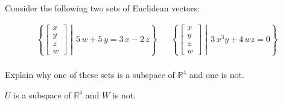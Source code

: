 
\begin{exerciseStatement}


Consider the following two sets of Euclidean vectors: 


\begin{align*}  \left\{ \left[\begin{array}{c}
x \\
y \\
z \\
w
\end{array}\right] \middle|\,5 \, w + 5 \, y = 3 \, x - 2 \, z\right\}  & &   \left\{ \left[\begin{array}{c}
x \\
y \\
z \\
w
\end{array}\right] \middle|\,3 \, x^{3} y + 4 \, w z = 0\right\}  \\ \end{align*}
            

 Explain why one of these sets is a subspace of \(\mathbb{R}^ 4 \) and one is not. 


\end{exerciseStatement}
    
\begin{exerciseAnswer} 


\(U\) is a subspace of \(\mathbb{R}^ 4 \) and \(W\) is not.


\end{exerciseAnswer}
    
